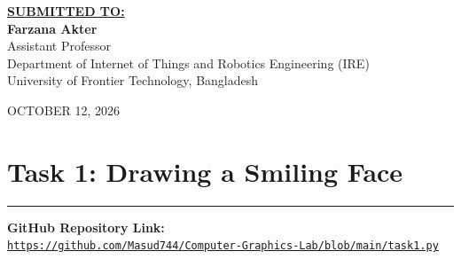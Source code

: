 \documentclass[11pt,a4paper]{article}
\begin{document}
\begin{titlepage}
    {\small \textbf{\underline{SUBMITTED TO:}}}\\[0.22cm]
    {\large \textbf{Farzana Akter}}\\[0.14cm]
    {\small Assistant Professor}\\[0.1cm]
    {\footnotesize Department of Internet of Things and Robotics Engineering (IRE)}\\[0.08cm]
    {\footnotesize University of Frontier Technology, Bangladesh}

    \vfill
    {\footnotesize OCTOBER 12, 2026}
    \vspace*{0.3cm}
\end{titlepage}

\newpage
{}

\section*{Task 1: Drawing a Smiling Face}
\noindent\rule{\textwidth}{0.6pt}\vspace{0.15cm}

\noindent\textbf{GitHub Repository Link:}\\
\href{https://github.com/Masud744/Computer-Graphics-Lab/blob/main/task1.py}{\texttt{https://github.com/Masud744/Computer-Graphics-Lab/blob/main/task1.py}}\vspace{0.25cm}
\end{document}
